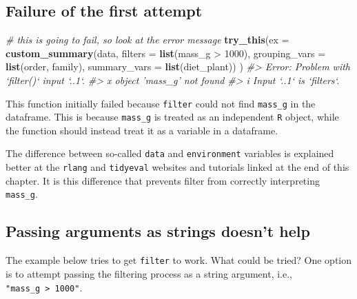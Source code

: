 \documentclass[]{book}
\newenvironment{Shaded}{}{}
\newcommand{\CommentTok}[1]{\textcolor[rgb]{0.38,0.63,0.69}{\textit{#1}}}
\newcommand{\DataTypeTok}[1]{\textcolor[rgb]{0.56,0.13,0.00}{#1}}
\newcommand{\DecValTok}[1]{\textcolor[rgb]{0.25,0.63,0.44}{#1}}
\newcommand{\KeywordTok}[1]{\textcolor[rgb]{0.00,0.44,0.13}{\textbf{#1}}}
\newcommand{\NormalTok}[1]{#1}
\newcommand{\OperatorTok}[1]{\textcolor[rgb]{0.40,0.40,0.40}{#1}}
\newcommand{\StringTok}[1]{\textcolor[rgb]{0.25,0.44,0.63}{#1}}
\begin{document}
\hypertarget{failure-of-the-first-attempt}{%
\subsection{Failure of the first attempt}\label{failure-of-the-first-attempt}}

\begin{Shaded}
\begin{Highlighting}[]
\CommentTok{# this is going to fail, so look at the error message}
\KeywordTok{try_this}\NormalTok{(}\DataTypeTok{ex =} \KeywordTok{custom_summary}\NormalTok{(data,}
                   \DataTypeTok{filters =} \KeywordTok{list}\NormalTok{(mass_g }\OperatorTok{>}\StringTok{ }\DecValTok{1000}\NormalTok{),}
                   \DataTypeTok{grouping_vars =} \KeywordTok{list}\NormalTok{(order, family),}
                   \DataTypeTok{summary_vars =} \KeywordTok{list}\NormalTok{(diet_plant))}
\NormalTok{         )}
\CommentTok{#> Error: Problem with `filter()` input `..1`.}
\CommentTok{#> x object 'mass_g' not found}
\CommentTok{#> i Input `..1` is `filters`.}
\end{Highlighting}
\end{Shaded}

This function initially failed because \texttt{filter} could not find \texttt{mass\_g} in the dataframe. This is because \texttt{mass\_g} is treated as an independent \texttt{R} object, while the function should instead treat it as a variable in a dataframe.

The difference between so-called \texttt{data} and \texttt{environment} variables is explained better at the \texttt{rlang} and \texttt{tidyeval} websites and tutorials linked at the end of this chapter. It is this difference that prevents filter from correctly interpreting \texttt{mass\_g}.

\hypertarget{passing-arguments-as-strings-doesnt-help}{%
\subsection{Passing arguments as strings doesn't help}\label{passing-arguments-as-strings-doesnt-help}}

The example below tries to get \texttt{filter} to work. What could be tried? One option is to attempt passing the filtering process as a string argument, i.e., \texttt{"mass\_g\ \textgreater{}\ 1000"}.
\end{document}
